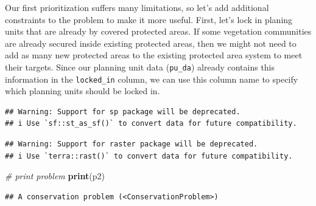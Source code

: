 \documentclass[12pt,]{book}
\newenvironment{Shaded}{\begin{snugshade}}{\end{snugshade}}
\newcommand{\CommentTok}[1]{\textcolor[rgb]{0.56,0.35,0.01}{\textit{#1}}}
\newcommand{\DataTypeTok}[1]{\textcolor[rgb]{0.13,0.29,0.53}{#1}}
\newcommand{\FloatTok}[1]{\textcolor[rgb]{0.00,0.00,0.81}{#1}}
\newcommand{\KeywordTok}[1]{\textcolor[rgb]{0.13,0.29,0.53}{\textbf{#1}}}
\newcommand{\NormalTok}[1]{#1}
\newcommand{\OperatorTok}[1]{\textcolor[rgb]{0.81,0.36,0.00}{\textbf{#1}}}
\newcommand{\OtherTok}[1]{\textcolor[rgb]{0.56,0.35,0.01}{#1}}
\newcommand{\StringTok}[1]{\textcolor[rgb]{0.31,0.60,0.02}{#1}}
\begin{document}
Our first prioritization suffers many limitations, so let's add additional constraints to the problem to make it more useful. First, let's lock in planing units that are already by covered protected areas. If some vegetation communities are already secured inside existing protected areas, then we might not need to add as many new protected areas to the existing protected area system to meet their targets. Since our planning unit data (\texttt{pu\_da}) already contains this information in the \texttt{locked\_in} column, we can use this column name to specify which planning units should be locked in.

\begin{Shaded}
\end{Shaded}

\begin{verbatim}
## Warning: Support for sp package will be deprecated.
## i Use `sf::st_as_sf()` to convert data for future compatibility.
\end{verbatim}

\begin{verbatim}
## Warning: Support for raster package will be deprecated.
## i Use `terra::rast()` to convert data for future compatibility.
\end{verbatim}

\begin{Shaded}
\begin{Highlighting}[]
\CommentTok{# print problem}
\KeywordTok{print}\NormalTok{(p2)}
\end{Highlighting}
\end{Shaded}

\begin{verbatim}
## A conservation problem (<ConservationProblem>)
\end{verbatim}
\end{document}
